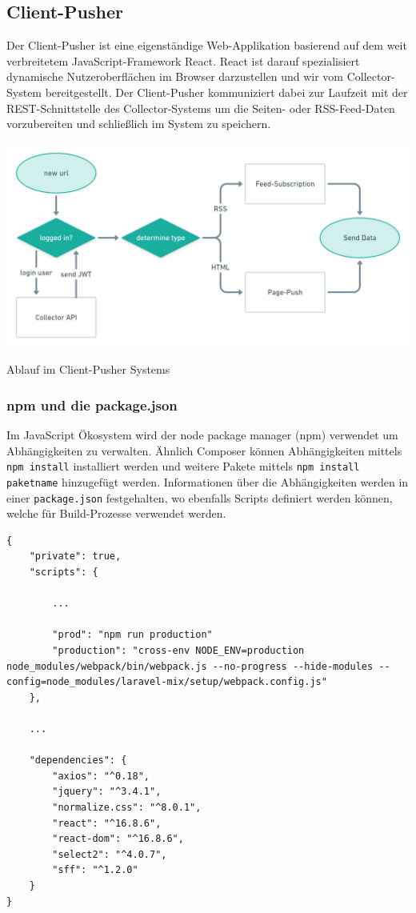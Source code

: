     \subsection{Client-Pusher}
        Der Client-Pusher ist eine eigenständige Web-Applikation basierend auf dem weit verbreitetem JavaScript-Framework React. React ist darauf spezialisiert dynamische Nutzeroberflächen im Browser darzustellen und wir vom Collector-System bereitgestellt. Der Client-Pusher kommuniziert dabei zur Laufzeit mit der REST-Schnittstelle des Collector-Systems um die Seiten- oder RSS-Feed-Daten vorzubereiten und schließlich im System zu speichern.

        \begin{center}
            \includegraphics[width=\textwidth]{images/collector-pusher-process.png}
            \caption{Ablauf im Client-Pusher Systems}
        \end{center}
        
        \subsubsection{npm und die package.json}
            Im JavaScript Ökosystem wird der node package manager (npm) verwendet um Abhängigkeiten zu verwalten. Ähnlich Composer können Abhängigkeiten mittels \texttt{npm install} installiert werden und weitere Pakete mittels \texttt{npm install paketname} hinzugefügt werden. Informationen über die Abhängigkeiten werden in einer \texttt{package.json} festgehalten, wo ebenfalls Scripts definiert werden können, welche für Build-Prozesse verwendet werden.
            
            \begin{lstlisting}[caption=Ausschnitt package.json des Client-Pushers]
{
    "private": true,
    "scripts": {
    
        ...
        
        "prod": "npm run production"
        "production": "cross-env NODE_ENV=production node_modules/webpack/bin/webpack.js --no-progress --hide-modules --config=node_modules/laravel-mix/setup/webpack.config.js"
    },
   
    ...
    
    "dependencies": {
        "axios": "^0.18",
        "jquery": "^3.4.1",
        "normalize.css": "^8.0.1",
        "react": "^16.8.6",
        "react-dom": "^16.8.6",
        "select2": "^4.0.7",
        "sff": "^1.2.0"
    }
}
        \end{lstlisting}
        

